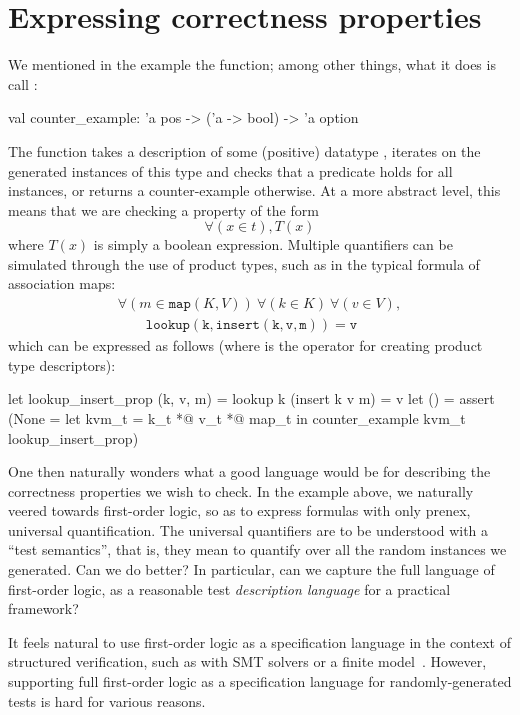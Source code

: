 \section{Expressing correctness properties}
\label{sec:properties}

We mentioned in the  example the  function; among other
things, what it does is call :
%
\begin{ocamlcode}
val counter_example: 'a pos -> ('a -> bool) -> 'a option
\end{ocamlcode}
%
The function takes a description of some (positive) datatype
, iterates on the generated instances of this type and checks
that a predicate  holds for all instances, or returns
a counter-example otherwise. At a more abstract level, this means that we are
checking a property of the form \[ \forall (x \in t), T(x) \] where
$T(x)$ is simply a boolean expression.
Multiple quantifiers can be simulated through the use of product types, such as
in the typical formula of association maps:
%
\[\begin{array}{l}
  \forall (m \in \mathtt{map}(K,V))\ \forall (k \in K)\ \forall (v \in V),\\
  \qquad \mathtt{lookup(k,insert(k,v,m)) = v}
\end{array}\]
%
which can be expressed as follows (where  is the operator for creating
product type descriptors):
%
\begin{ocamlcode}
  let lookup_insert_prop (k, v, m) =
    lookup k (insert k v m) = v
  let () = assert (None =
    let kvm_t = k_t *@ v_t *@ map_t in
    counter_example kvm_t lookup_insert_prop)
\end{ocamlcode}

One then naturally wonders what a good language would be for describing the
correctness properties we wish to check. In the example above, we naturally
veered towards first-order logic, so as to express formulas with only prenex,
universal quantification. The universal quantifiers are to be understood with a
``test semantics'', that is, they mean to quantify over all the random instances
we generated.
%
Can we do better? In particular, can we capture the full language of first-order
logic, as a reasonable test \emph{description language} for a practical
framework?

It feels natural to use first-order logic as a specification language in the
context of structured verification, such as with SMT solvers or a finite
model~\cite{nitpick}.
However, supporting full first-order logic as a specification language for
randomly-generated tests is hard for various reasons. 

